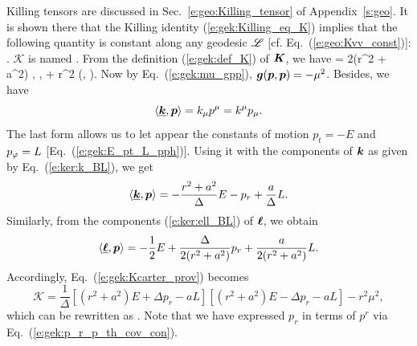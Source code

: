Killing tensors are discussed in Sec.~\ref{e:geo:Killing_tensor} of Appendix~\ref{s:geo}.
It is shown there that the Killing identity (\ref{e:gek:Killing_eq_K}) implies that
the following quantity is constant along any geodesic $\mathscr{L}$ [cf. Eq.~(\ref{e:geo:Kvv_const})]:
\be
     .
\ee
$\mathscr{K}$ is named .
From the definition (\ref{e:gek:def_K}) of $\bm{K}$, we have
\be \label{e:gek:Kcarter_prov}
     = 2(r^2 + a^2) \langle {},  \rangle
        \langle \uu{\el},  \rangle + r^2 (, ).
\ee
Now by Eq.~(\ref{e:gek:mu_gpp}), $\bm{g}(\bm{p}, \bm{p}) = - \mu^2$. Besides, we
have
\[
  \langle \underline{\bm{k}}, \bm{p} \rangle = k_\mu p^\mu = k^\mu p_\mu .
\]
The last form allows us to let appear the constants of motion $p_t = -E$ and
$p_\varphi = L$ [Eq.~(\ref{e:gek:E_pt_L_pph})]. Using it with the components
of $\bm{k}$ as given by Eq.~(\ref{e:ker:k_BL}), we get
\[
    \langle \underline{\bm{k}}, \bm{p} \rangle = - \frac{r^2 + a^2}{\Delta} E
    - p_r + \frac{a}{\Delta} L .
\]
Similarly, from the components (\ref{e:ker:ell_BL}) of $\bm{\ell}$, we obtain
\[
     \langle \underline{\bm{\ell}}, \bm{p} \rangle = - \frac{1}{2} E + \frac{\Delta}{2(r^2 + a^2)} p_r
     + \frac{a}{2(r^2 + a^2)} L .
\]
Accordingly, Eq.~(\ref{e:gek:Kcarter_prov}) becomes
\[
    \mathscr{K} = \frac{1}{\Delta} \left[ (r^2 + a^2) E + \Delta p_r - a L \right]
      \left[ (r^2 + a^2) E - \Delta p_r - a L \right] - r^2 \mu^2 ,
\]
which can be rewritten as
\be \label{e:gek:Kcarter_first_int}
   .
\ee
Note that we have expressed $p_r$ in terms of $p^r$ via Eq.~(\ref{e:gek:p_r_p_th_cov_con}).


